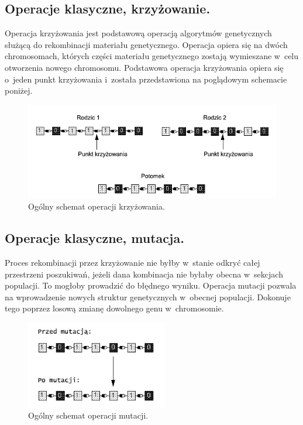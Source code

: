 \documentclass[twoside,12pt]{report}
\begin{document}
\subsection{Operacje klasyczne, krzyżowanie.}

Operacja krzyżowania jest podstawową operacją algorytmów genetycznych służącą do rekombinacji materiału genetycznego. Operacja opiera się na dwóch chromosomach, których części materiału genetycznego zostają wymieszane w~celu otworzenia nowego chromosomu. Podstawowa operacja krzyżowania opiera się o~jeden punkt krzyżowania i~została przedstawiona na poglądowym schemacie poniżej\cite{gene mutikrzyz}.

\begin{figure}[ht]
\begin{center}
\includegraphics[width=\textwidth]{img/crossover}
\caption{Ogólny schemat operacji krzyżowania.}
\end{center}
\end{figure}

\subsection{Operacje klasyczne, mutacja.}

Proces rekombinacji przez krzyżowanie nie byłby w~stanie odkryć całej przestrzeni poszukiwań, jeżeli dana kombinacja nie byłaby obecna w~sekcjach populacji. To mogłoby prowadzić do błędnego wyniku. Operacja mutacji pozwala na wprowadzenie nowych struktur genetycznych w~obecnej populacji. Dokonuje tego poprzez losową zmianę dowolnego genu w~chromosomie\cite{gene mutikrzyz}.

\begin{figure}[ht]
\begin{center}
\includegraphics[width=0.55\textwidth]{img/mutation}
\caption{Ogólny schemat operacji mutacji.}
\end{center}
\end{figure}
\end{document}
